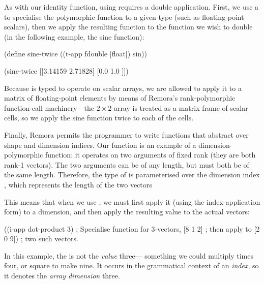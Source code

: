 As with our identity function, using  requires a double
application.
First, we use a  to specialise the polymorphic function
to a given type (such as floating-point scalars),
then we apply the resulting function to the function we wish to double
(in the following example, the sine function):
\begin{code}
(define sine-twice ((t-app fdouble [float]) sin))

(sine-twice [[3.14159 2.71828]
             [0.0     1.0    ]])\end{code}
Because  is typed to operate on scalar arrays,
we are allowed to apply it to a matrix of floating-point elements
by means of Remora's rank-polymorphic function-call machinery---the
$2\times 2$ array is treated as a matrix frame of scalar cells,
so we apply the sine function twice to each of the cells.

Finally, Remora permits the programmer to write functions that
abstract over shape and dimension indices.
%
%
Our  function is an example of a dimension-polymorphic
function: it operates on two arguments of fixed rank
(they are both rank-1 vectors).
The two arguments can be of any length, but must both be of the same
length.
Therefore, the type of  is parameterised over
the dimension index , which represents the length of the two vectors
\begin{code}
\end{code}
This means that when we use ,
we must first apply it (using the  index-application form)
to a dimension, and then apply the resulting value to the actual
vectors:
\begin{code}
((i-app dot-product 3) ; Specialise function for 3-vectors, 
 [8 1 2]               ; then apply to
 [2 0 9])              ; two such vectors.\end{code}
In this example, the  is not the \emph{value} three---%
something we could multiply times four, or square to make nine.
It occurs in the grammatical context of an \emph{index},
so it denotes the \emph{array dimension} three.


